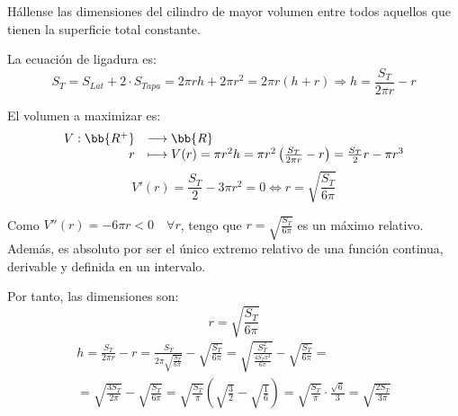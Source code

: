 \begin{ejercicio}
    Hállense las dimensiones del cilindro de mayor volumen entre todos aquellos que tienen la superficie total constante.
    \begin{figure}[H]
        \centering
    \end{figure}

    La ecuación de ligadura es:
    \begin{equation*}
        S_{T} = S_{Lat} + 2\cdot S_{Tapa} = 2\pi r h +2\pi r^2 = 2\pi r(h+r)\Longrightarrow h=\frac{S_T}{2\pi r} -r
    \end{equation*}

    El volumen a maximizar es:
    \begin{equation*}
        \begin{array}{rl}
            V:\bb{R^+} & \longrightarrow \bb{R}\\
                    r & \longmapsto V(r)=\pi r^2h = \pi r^2 \left(\frac{S_T}{2\pi r} -r\right)
                    = \frac{S_T}{2}r -\pi r^3
        \end{array}
    \end{equation*}
    \begin{equation*}
        V'(r)=\frac{S_T}{2}-3\pi r^2 = 0 \Longleftrightarrow r=\sqrt{\frac{S_T}{6\pi}}
    \end{equation*}

    Como $V''(r)=-6\pi r<0\quad \forall r$, tengo que $r=\sqrt{\frac{S_T}{6\pi}}$ es un máximo relativo. Además, es absoluto por ser el único extremo relativo de una función continua, derivable y definida en un intervalo.

    Por tanto, las dimensiones son:
    \begin{equation*}
        r=\sqrt{\frac{S_T}{6\pi}}
    \end{equation*}
    \begin{multline*}
        h=\frac{S_T}{2\pi r} -r
        =\frac{S_T}{2\pi \sqrt{\frac{S_T}{6\pi}}} -\sqrt{\frac{S_T}{6\pi}}
        =\sqrt{\frac{S_T^2}{\frac{4S_T\pi^2}{6\pi}}} -\sqrt{\frac{S_T}{6\pi}}
        =\\=
        \sqrt{\frac{3S_T}{2\pi}} -\sqrt{\frac{S_T}{6\pi}} = \sqrt{\frac{S_T}{\pi}}\left(\sqrt{\frac{3}{2}} - \sqrt{\frac{1}{6}}\right)
        = \sqrt{\frac{S_T}{\pi}}\cdot \frac{\sqrt{6}}{3} = \sqrt{\frac{2S_T}{3\pi}}
    \end{multline*}
\end{ejercicio}

